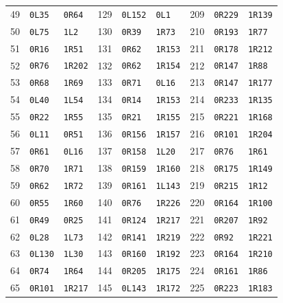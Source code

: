 \begin{longtable}{rll@{\hspace{0.45cm}}rll@{\hspace{0.45cm}}rll}
49 & \texttt{0L35} & \texttt{0R64} & 129 & \texttt{0L152} & \texttt{0L1} & 209 & \texttt{0R229} & \texttt{1R139} \\
50 & \texttt{0L75} & \texttt{1L2} & 130 & \texttt{0R39} & \texttt{1R73} & 210 & \texttt{0R193} & \texttt{1R77} \\
51 & \texttt{0R16} & \texttt{1R51} & 131 & \texttt{0R62} & \texttt{1R153} & 211 & \texttt{0R178} & \texttt{1R212} \\
52 & \texttt{0R76} & \texttt{1R202} & 132 & \texttt{0R62} & \texttt{1R154} & 212 & \texttt{0R147} & \texttt{1R88} \\
53 & \texttt{0R68} & \texttt{1R69} & 133 & \texttt{0R71} & \texttt{0L16} & 213 & \texttt{0R147} & \texttt{1R177} \\
54 & \texttt{0L40} & \texttt{1L54} & 134 & \texttt{0R14} & \texttt{1R153} & 214 & \texttt{0R233} & \texttt{1R135} \\
55 & \texttt{0R22} & \texttt{1R55} & 135 & \texttt{0R21} & \texttt{1R155} & 215 & \texttt{0R221} & \texttt{1R168} \\
56 & \texttt{0L11} & \texttt{0R51} & 136 & \texttt{0R156} & \texttt{1R157} & 216 & \texttt{0R101} & \texttt{1R204} \\
57 & \texttt{0R61} & \texttt{0L16} & 137 & \texttt{0R158} & \texttt{1L20} & 217 & \texttt{0R76} & \texttt{1R61} \\
58 & \texttt{0R70} & \texttt{1R71} & 138 & \texttt{0R159} & \texttt{1R160} & 218 & \texttt{0R175} & \texttt{1R149} \\
59 & \texttt{0R62} & \texttt{1R72} & 139 & \texttt{0R161} & \texttt{1L143} & 219 & \texttt{0R215} & \texttt{1R12} \\
60 & \texttt{0R55} & \texttt{1R60} & 140 & \texttt{0R76} & \texttt{1R226} & 220 & \texttt{0R164} & \texttt{1R100} \\
61 & \texttt{0R49} & \texttt{0R25} & 141 & \texttt{0R124} & \texttt{1R217} & 221 & \texttt{0R207} & \texttt{1R92} \\
62 & \texttt{0L28} & \texttt{1L73} & 142 & \texttt{0R141} & \texttt{1R219} & 222 & \texttt{0R92} & \texttt{1R221} \\
63 & \texttt{0L130} & \texttt{1L30} & 143 & \texttt{0R160} & \texttt{1R192} & 223 & \texttt{0R164} & \texttt{1R210} \\
64 & \texttt{0R74} & \texttt{1R64} & 144 & \texttt{0R205} & \texttt{1R175} & 224 & \texttt{0R161} & \texttt{1R86} \\
65 & \texttt{0R101} & \texttt{1R217} & 145 & \texttt{0L143} & \texttt{1R172} & 225 & \texttt{0R223} & \texttt{1R183} \\

\end{longtable}

